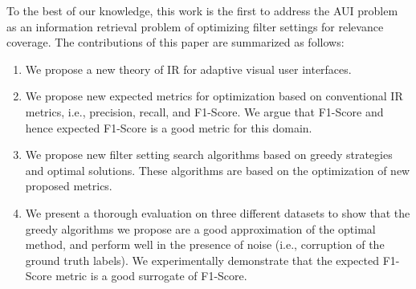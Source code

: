 To the best of our knowledge, this work is the first to address the AUI problem as an information retrieval problem of optimizing filter settings for relevance coverage. The contributions of this paper are summarized as follows: 
 \begin{enumerate}
\item We propose a new theory of IR for adaptive visual user interfaces. 
\item We propose new expected metrics for optimization based on conventional IR metrics, i.e., precision, recall, and F1-Score.
We argue that F1-Score and hence expected F1-Score is a good metric for this domain.
\item We propose new filter setting search algorithms based on greedy strategies and optimal solutions. These algorithms are based on the optimization of new proposed metrics.
\item We present a thorough evaluation on three different datasets to show that the greedy algorithms we propose are a good approximation of the optimal method, and perform well in the presence of noise (i.e., corruption of the ground truth labels).
We experimentally demonstrate that the expected F1-Score metric is a good surrogate of F1-Score.
\end{enumerate}




